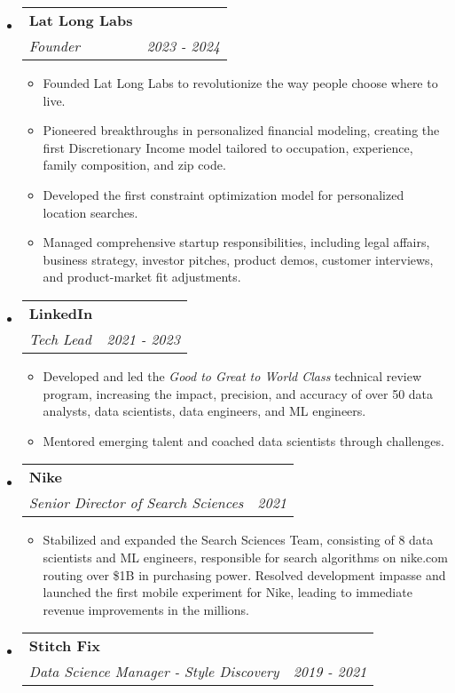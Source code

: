 \documentclass[letterpaper,11pt]{article}
\makeatletter
\newcommand{\resitem}[1]{\item #1 \vspace{-2pt}}
\newcommand{\ressubheading}[4]{

\begin{tabular*}{6.5in}{l@{\cftdotfill{\cftsecdotsep}\extracolsep{\fill}}r}

		\textbf{#1} & #2 \\

		\textit{#3} & \textit{#4} \\

\end{tabular*}\vspace{-6pt}}
\makeatother
\begin{document}
\begin{itemize}

\item[] 
	\ressubheading{\color{latlonglabscolor}Lat Long Labs}{}{Founder}{2023 - 2024}

        \begin{itemize}
            \resitem{Founded Lat Long Labs to revolutionize the way people choose where to live.}
            \resitem{Pioneered breakthroughs in personalized financial modeling, creating the first Discretionary Income model tailored to occupation, experience, family composition, and zip code.}
            \resitem{Developed the first constraint optimization model for personalized location searches.}
            \resitem{Managed comprehensive startup responsibilities, including legal affairs, business strategy, investor pitches, product demos, customer interviews, and product-market fit adjustments.}
        \end{itemize}

	
\item[] 
	\ressubheading{\color{linkedincolor}LinkedIn}{}{Tech Lead}{2021 - 2023}

	\begin{itemize}
	    \resitem{Developed and led the {\it Good to Great to World Class} technical review program, increasing the impact, precision, and accuracy of over 50 data analysts, data scientists, data engineers, and ML engineers.}
            \resitem{Mentored emerging talent and coached data scientists through challenges.}
	\end{itemize}
 
\item[] 
	\ressubheading{\color{nikecolor}Nike}{}{Senior Director of Search Sciences}{2021}

	\begin{itemize}
	    \resitem{Stabilized and expanded the Search Sciences Team, consisting of 8 data scientists and ML engineers, responsible for search algorithms on nike.com routing over \$1B in purchasing power. Resolved development impasse and launched the first mobile experiment for Nike, leading to immediate revenue improvements in the millions.}
	\end{itemize}
	
	
\item[] 
	\ressubheading{\color{stitchfixcolor}Stitch Fix}{}{Data Science Manager - Style Discovery}{2019 - 2021}


\end{itemize}
\end{document}
